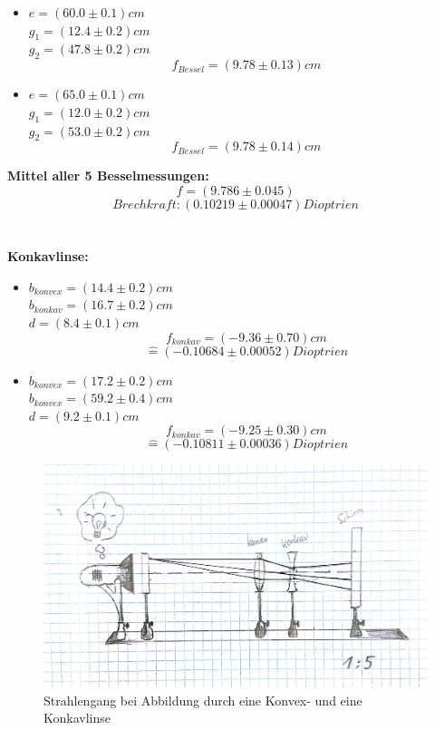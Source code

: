 \documentclass[12pt,a4paper]{article}
\begin{document}
\begin{multicols}{2}
\begin{itemize}
	\item $e=(60.0 \pm 0.1)cm$\\
	\indent $g_1= (12.4 \pm 0.2) cm$\\
	$g_2 = (47.8 \pm 0.2)cm$
	$$f_{Bessel}=(9.78 \pm 0.13) cm$$
	
	\item $e=(65.0 \pm 0.1)cm$\\
	\indent $g_1 = (12.0 \pm 0.2) cm$\\
	$g_2 =(53.0 \pm 0.2)cm$
	$$f_{Bessel} = (9.78 \pm 0.14)cm$$

\end{itemize}

\textbf{Mittel aller 5 Besselmessungen:}\\
$$f=(9.786 \pm 0.045)$$
$$Brechkraft: (0.10219 \pm 0.00047) Dioptrien$$\\
\\
\textbf{Konkavlinse:}
\begin{itemize}
	\item $b_{konvex}=(14.4 \pm 0.2) cm$\\
	$b_{konkav}=(16.7 \pm 0.2)cm$\\
	$d=(8.4 \pm 0.1)cm$
	$$f_{konkav}= (-9.36 \pm 0.70)cm$$
	$$\widehat{=}(-0.10684 \pm 0.00052)Dioptrien$$
	
	\item $b_{konvex}=(17.2 \pm 0.2)cm$\\
	$b_{konvex}=(59.2 \pm 0.4)cm$\\
	$d=(9.2 \pm 0.1)cm$
	$$f_{konkav}= (-9.25 \pm 0.30)cm$$
	$$\widehat{=}(-0.10811 \pm 0.00036)Dioptrien$$
	
	
\end{itemize}


\end{multicols}

\begin{figure}[H]
	\centering
	\includegraphics[scale=0.36]{./figure/strahlengang_konvex-konkav.png}
	\caption{Strahlengang bei Abbildung durch eine Konvex- und eine Konkavlinse}
	\label{fig:strahlengang_konvex-konkav}
\end{figure}
\end{document}
